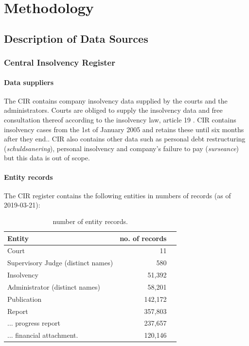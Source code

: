 \section{Methodology}
\subsection{Description of Data Sources}
\subsubsection{Central Insolvency Register}
\paragraph{Data suppliers}
The CIR contains company insolvency data supplied by the courts and the administrators. Courts are obliged to supply the insolvency data and free consultation thereof according to the insolvency law, article 19 \cite{law:1}. CIR contains insolvency cases from the 1st of January 2005 and retains these until six months after they end.. CIR also contains other data such as personal debt restructuring (\textit{schuldsanering}), personal insolvency and company's failure to pay (\textit{surseance}) but this data is out of scope.

\paragraph{Entity records}
The CIR register contains the following entities in numbers of records (as of 2019-03-21):

\begin{table}[h]
\caption{number of entity records.}
\centering
\begin{tabular}{l r r}
\hline\hline
Entity & no. of records\\
\hline
Court & 11 \\
Supervisory Judge (distinct names) & 580 \\
Insolvency & 51,392 \\
Administrator (distinct names) & 58,201 \\
Publication & 142,172 \\
Report & 357,803 \\
... progress report & 237,657 \\
... financial attachment. & 120,146 \\
\hline
\end{tabular}
\label{table:cir_contents}
\end{table}

